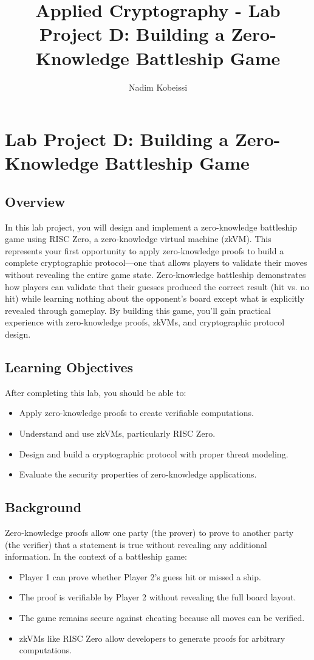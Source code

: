 \documentclass[10pt,a4paper,american]{exam}
\title{Applied Cryptography - Lab Project D: Building a Zero-Knowledge Battleship Game}
\author{Nadim Kobeissi}
\begin{document}
\classhandoutheader
\section*{Lab Project D: Building a Zero-Knowledge Battleship Game}

\subsection*{Overview}
In this lab project, you will design and implement a zero-knowledge battleship game using RISC Zero, a zero-knowledge virtual machine (zkVM). This represents your first opportunity to apply zero-knowledge proofs to build a complete cryptographic protocol—one that allows players to validate their moves without revealing the entire game state. Zero-knowledge battleship demonstrates how players can validate that their guesses produced the correct result (hit vs. no hit) while learning nothing about the opponent's board except what is explicitly revealed through gameplay. By building this game, you'll gain practical experience with zero-knowledge proofs, zkVMs, and cryptographic protocol design.

\subsection*{Learning Objectives}
After completing this lab, you should be able to:
\begin{itemize}
	\item Apply zero-knowledge proofs to create verifiable computations.
	\item Understand and use zkVMs, particularly RISC Zero.
	\item Design and build a cryptographic protocol with proper threat modeling.
	\item Evaluate the security properties of zero-knowledge applications.
\end{itemize}

\subsection*{Background}
Zero-knowledge proofs allow one party (the prover) to prove to another party (the verifier) that a statement is true without revealing any additional information. In the context of a battleship game:
\begin{itemize}
	\item Player 1 can prove whether Player 2's guess hit or missed a ship.
	\item The proof is verifiable by Player 2 without revealing the full board layout.
	\item The game remains secure against cheating because all moves can be verified.
	\item zkVMs like RISC Zero allow developers to generate proofs for arbitrary computations.
\end{itemize}
\end{document}
